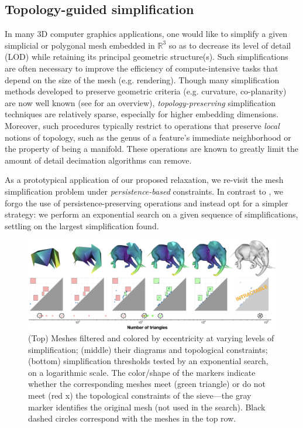 \documentclass[pdflatex,sn-mathphys-num]{sn-jnl}
\begin{document}
\subsection{Topology-guided simplification}\label{topology-guided-simplification}

In many 3D computer graphics applications, one would like to simplify a given simplicial or polygonal mesh embedded in \(\mathbb{R}^{3}\) so as to decrease its level of detail (LOD) while retaining its principal geometric structure(s). Such simplifications are often necessary to improve the efficiency of compute-intensive tasks that depend on the size of the mesh (e.g. rendering). Though many simplification methods developed to preserve geometric criteria (e.g. curvature, co-planarity) are now well known (see \cite{heckbert1997survey} for an overview), \emph{topology-preserving} simplification techniques are relatively sparse, especially for higher embedding dimensions. Moreover, such procedures typically restrict to operations that preserve \emph{local} notions of topology, such as the genus of a feature's immediate neighborhood or the property of being a manifold. These operations are known to greatly limit the amount of detail decimation algorithms can remove.

As a prototypical application of our proposed relaxation, we re-visit the mesh simplification problem under \emph{persistence-based} constraints. In contrast to \cite{fugacci2020topology}, we forgo the use of persistence-preserving operations and instead opt for a simpler strategy: we perform an exponential search on a given sequence of simplifications, settling on the largest simplification found.

\begin{figure}
\centering
\includegraphics[width=0.95\linewidth,height=\textheight,keepaspectratio]{../images/elephant_sparsify.png}
\caption{(Top) Meshes filtered and colored by eccentricity at varying levels of simplification; (middle) their diagrams and topological constraints; (bottom) simplification thresholds tested by an exponential search, on a logarithmic scale. The color/shape of the markers indicate whether the corresponding meshes meet (green triangle) or do not meet (red x) the topological constraints of the sieve---the gray marker identifies the original mesh (not used in the search). Black dashed circles correspond with the meshes in the top row.}\label{fig:elephant_sparsify}
\end{figure}
\end{document}
